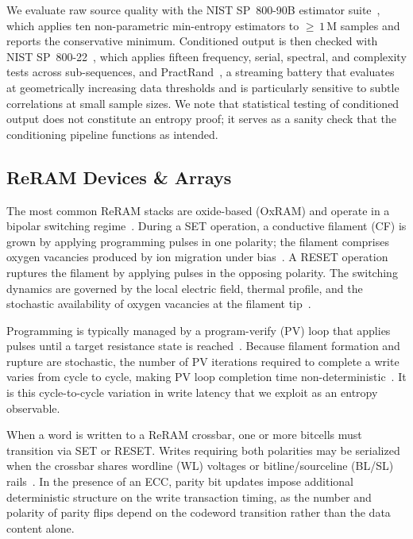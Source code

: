 We evaluate raw source quality with the NIST SP~800-90B estimator suite~\cite{sonmez2016recommendation}, which applies ten non-parametric min-entropy estimators to ${\geq}\,1$\,M samples and reports the conservative minimum. Conditioned output is then checked with NIST SP~800-22~\cite{rukhin2001statistical}, which applies fifteen frequency, serial, spectral, and complexity tests across sub-sequences, and PractRand~\cite{practrand}, a streaming battery that evaluates at geometrically increasing data thresholds and is particularly sensitive to subtle correlations at small sample sizes.  We note that statistical testing of conditioned output does not constitute an entropy proof; it serves as a sanity check that the conditioning pipeline functions as intended.

\subsection{ReRAM Devices \& Arrays}

The most common ReRAM stacks are oxide-based (OxRAM) and operate in a bipolar switching regime~\cite{wong2012metal, chen2020reram}. During a SET operation, a conductive filament (CF) is grown by applying programming pulses in one polarity; the filament comprises oxygen vacancies produced by ion migration under bias~\cite{wei2008highly, yu2012switching}.  A RESET operation ruptures the filament by applying pulses in the opposing polarity. The switching dynamics are governed by the local electric field, thermal profile, and the stochastic availability of oxygen vacancies at the filament tip~\cite{yu2012switching}.

Programming is typically managed by a program-verify (PV) loop that applies pulses until a target resistance state is reached~\cite{kawahara2013filament, milo2021accurate}.  Because filament formation and rupture are stochastic, the number of PV iterations required to complete a write varies from cycle to cycle, making PV loop completion time non-deterministic~\cite{yu2012switching}.  It is this cycle-to-cycle variation in write latency that we exploit as an entropy observable.

When a word is written to a ReRAM crossbar, one or more bitcells must transition via SET or RESET.  Writes requiring both polarities may be serialized when the crossbar shares wordline (WL) voltages or bitline/sourceline (BL/SL) rails~\cite{sheaves2026brewrc}.  In the presence of an ECC, parity bit updates impose additional deterministic structure on the write transaction timing, as the number and polarity of parity flips depend on the codeword transition rather than the data content alone. 

